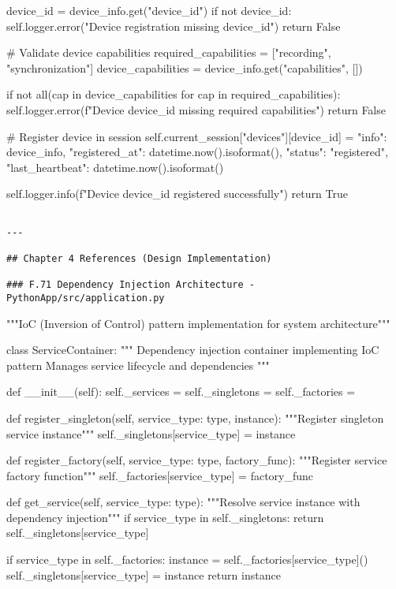 \documentclass[12pt,a4paper]{report}
\begin{document}
    device\_id = device\_info.get("device\_id")
    if not device\_id:
        self.logger.error("Device registration missing device\_id")
        return False

    \# Validate device capabilities
    required\_capabilities = ["recording", "synchronization"]
    device\_capabilities = device\_info.get("capabilities", [])

    if not all(cap in device\_capabilities for cap in required\_capabilities):
        self.logger.error(f"Device {device\_id} missing required capabilities")
        return False

    \# Register device in session
    self.current\_session["devices"][device\_id] = {
        "info": device\_info,
        "registered\_at": datetime.now().isoformat(),
        "status": "registered",
        "last\_heartbeat": datetime.now().isoformat()
    }

    self.logger.info(f"Device {device\_id} registered successfully")
    return True
\begin{verbatim}

---

## Chapter 4 References (Design Implementation)

### F.71 Dependency Injection Architecture - PythonApp/src/application.py

\end{verbatim}
"""IoC (Inversion of Control) pattern implementation for system architecture"""


class ServiceContainer:
    """
    Dependency injection container implementing IoC pattern
    Manages service lifecycle and dependencies
    """

    def \_\_init\_\_(self):
        self.\_services = {}
        self.\_singletons = {}
        self.\_factories = {}

    def register\_singleton(self, service\_type: type, instance):
        """Register singleton service instance"""
        self.\_singletons[service\_type] = instance

    def register\_factory(self, service\_type: type, factory\_func):
        """Register service factory function"""
        self.\_factories[service\_type] = factory\_func

    def get\_service(self, service\_type: type):
        """Resolve service instance with dependency injection"""
        if service\_type in self.\_singletons:
            return self.\_singletons[service\_type]

        if service\_type in self.\_factories:
            instance = self.\_factories[service\_type]()
            self.\_singletons[service\_type] = instance
            return instance
\end{document}
